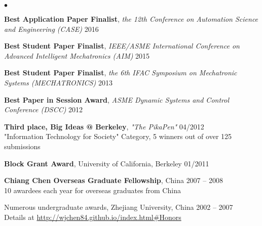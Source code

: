 \documentclass[UTF8,nofonts]{res}
\begin{document}
\begin{resume}
\begin{list}{$\bullet$}{\setlength\leftmargin{0in}\setlength\topsep{0in}}
\item \textbf{Best Application Paper Finalist}, \emph{the 12th Conference on Automation Science and Engineering (CASE)} \hfill{2016}
\item \textbf{Best Student Paper Finalist}, \emph{IEEE/ASME International Conference on Advanced Intelligent Mechatronics (AIM)} \hfill{2015}
\item \textbf{Best Student Paper Finalist}, \emph{the 6th IFAC Symposium on Mechatronic Systems (MECHATRONICS)} \hfill{2013}
\item \textbf{Best Paper in Session Award}, \emph{ASME Dynamic Systems and Control Conference (DSCC)} \hfill{2012}
\item \textbf{Third place, Big Ideas @ Berkeley}, \emph{"The PikaPen"} \hfill{04/2012} \\
"Information Technology for Society" Category, 5 winners out of over 125 submissions
\item \textbf{Block Grant Award}, University of California, Berkeley \hfill{01/2011}
\item \textbf{Chiang Chen Overseas Graduate Fellowship}, China \hfill{2007 -- 2008}\\
10 awardees each year for overseas graduates from China
\item Numerous undergraduate awards, Zhejiang University, China \hfill{2002 -- 2007}\\
Details at \url{http://wjchen84.github.io/index.html#Honors}
\end{list}


\end{resume}
\end{document}
